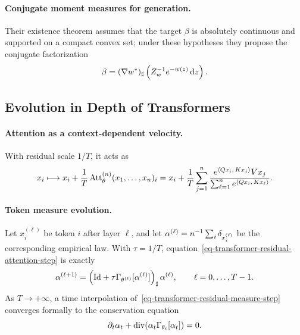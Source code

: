 \paragraph{Conjugate moment measures for generation.}
Their existence theorem assumes that the target \(\beta\) is absolutely continuous and supported on a compact convex set; under these hypotheses they propose the conjugate factorization
\begin{equation}\label{eq-conjugate-moment-measure}
\beta
=
(\nabla w^*)_\sharp
\left(Z_w^{-1}e^{-w(z)}\,\mathrm{d} z\right).
\end{equation}
\subsection{Evolution in Depth of Transformers}
\label{sec-transformer-depth-evolution}
\paragraph{Attention as a context-dependent velocity.}
With residual scale \(1/T\), it acts as
\begin{equation}\label{eq-transformer-residual-attention-step}
x_i
\longmapsto
x_i+\frac1T\operatorname{Att}^{(n)}_\theta(x_1,\ldots,x_n)_i
=
x_i+\frac1T
\sum_{j=1}^n
\frac{e^{\langle Qx_i,\,Kx_j\rangle}Vx_j}
{\sum_{\ell=1}^n e^{\langle Qx_i,\,Kx_\ell\rangle}}.
\end{equation}
\paragraph{Token measure evolution.}
Let \(x_i^{(\ell)}\) be token \(i\) after layer \(\ell\), and let \(\alpha^{(\ell)}=n^{-1}\sum_i\delta_{x_i^{(\ell)}}\) be the corresponding empirical law. With \(\tau=1/T\), equation~\eqref{eq-transformer-residual-attention-step} is exactly
\begin{equation}\label{eq-transformer-residual-measure-step}
\alpha^{(\ell+1)}
=
\left(
\mathrm{Id}+\tau\Gamma_{\theta^{(\ell)}}[\alpha^{(\ell)}]
\right)_\sharp
\alpha^{(\ell)},
\qquad
\ell=0,\ldots,T-1.
\end{equation}
As \(T\to+\infty\), a time interpolation of~\eqref{eq-transformer-residual-measure-step} converges formally to the conservation equation
\begin{equation}\label{eq-transformer-mean-field-pde}
\partial_t\alpha_t
+
\operatorname{div}\!\left(\alpha_t\Gamma_{\theta_t}[\alpha_t]\right)
=
0.
\end{equation}
